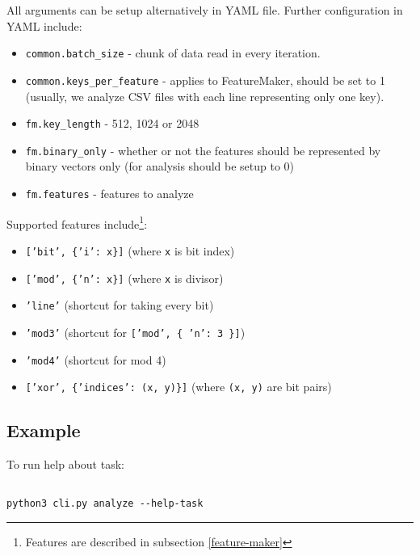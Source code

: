 \noindent
All arguments can be setup alternatively in YAML file. Further configuration in YAML include:

\begin{itemize}

\item \texttt{common.batch\_size} - chunk of data read in every iteration.
\item \texttt{common.keys\_per\_feature} - applies to FeatureMaker, should be set to 1 (usually, we analyze CSV files with each line representing only one key).
\item \texttt{fm.key\_length} - 512, 1024 or 2048
\item \texttt{fm.binary\_only} - whether or not the features should be represented by binary vectors only (for analysis should be setup to 0)
\item \texttt{fm.features} - features to analyze

\end{itemize}

\noindent
Supported features include\footnote{Features are described in subsection \ref{feature-maker}}:

\begin{itemize}

\item \texttt{['bit', \{'i': x\}]} (where \texttt{x} is bit index)
\item \texttt{['mod', \{'n': x\}]} (where \texttt{x} is divisor)
\item \texttt{'line'} (shortcut for taking every bit) 
\item \texttt{'mod3'} (shortcut for \texttt{['mod', \{ 'n': 3 \}]})
\item \texttt{'mod4'} (shortcut for mod 4)
\item \texttt{['xor', \{'indices': (x, y)\}]} (where \texttt{(x, y)} are bit pairs)

\end{itemize}

\subsection*{Example}

To run help about task:

\begin{verbatim}

python3 cli.py analyze --help-task

\end{verbatim}

